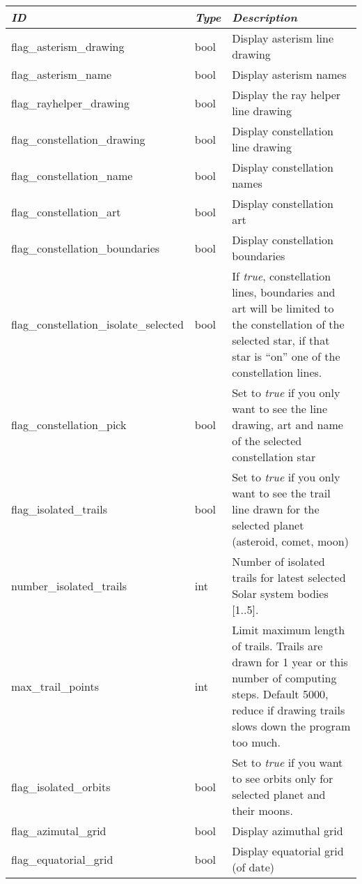 \begin{longtable}{l|l|p{77mm}}
\toprule
\emph{ID} & \emph{Type} & \emph{Description}\\\midrule
flag\_asterism\_drawing         & bool  & Display asterism line drawing\\%
flag\_asterism\_name            & bool  & Display asterism names\\%
flag\_rayhelper\_drawing        & bool  & Display the ray helper line drawing\\%
flag\_constellation\_drawing    & bool  & Display constellation line drawing\\%
flag\_constellation\_name       & bool  & Display constellation names\\%
flag\_constellation\_art        & bool  & Display constellation art\\%
flag\_constellation\_boundaries & bool  & Display constellation boundaries \\%
flag\_constellation\_isolate\_selected  & bool & If \emph{true}, constellation lines, boundaries and art will be limited to the constellation of the selected star, 
                                                 if that star is ``on'' one of the constellation lines.\\%
flag\_constellation\_pick     & bool & Set to \emph{true} if you only want to see the line drawing, art and name of the selected constellation star\\\midrule
%
flag\_isolated\_trails        & bool & Set to \emph{true} if you only want to see the trail line drawn for the selected planet (asteroid, comet, moon)\\%
number\_isolated\_trails      & int  & Number of isolated trails for latest selected Solar system bodies [1..5].\\%
max\_trail\_points            & int  & Limit maximum length of trails. Trails are drawn for 1 year or this number of computing steps.
                                       Default 5000, reduce if drawing trails slows down the program too much.\\
flag\_isolated\_orbits        & bool & Set to \emph{true} if you want to see orbits only for selected planet and their moons.\\%
flag\_azimutal\_grid          & bool & Display azimuthal grid \\%
flag\_equatorial\_grid        & bool & Display equatorial grid (of date) \\%

\end{longtable}
